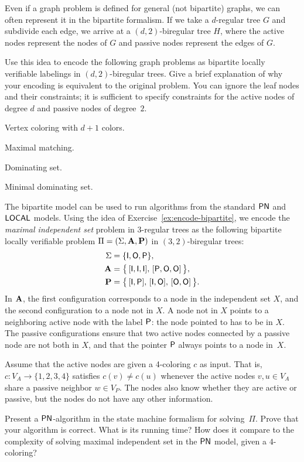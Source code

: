 \begin{ex}\label{ex:encode-bipartite}
Even if a graph problem is defined for general (not bipartite) graphs, we can often represent it in the bipartite formalism. If we take a $d$-regular tree $G$ and subdivide each edge, we arrive at a $(d,2)$-biregular tree $H$, where the active nodes represent the nodes of $G$ and passive nodes represent the edges of $G$.

Use this idea to encode the following graph problems as bipartite locally verifiable labelings in $(d,2)$-biregular trees. Give a brief explanation of why your encoding is equivalent to the original problem. You can ignore the leaf nodes and their constraints; it is sufficient to specify constraints for the active nodes of degree $d$ and passive nodes of degree~$2$.
\begin{subex}[noitemsep]
	\item Vertex coloring with $d+1$ colors.
	\item Maximal matching.
	\item Dominating set.
	\item Minimal dominating set.
\end{subex}
\end{ex}

\begin{ex}
	The bipartite model can be used to run algorithms from the standard $\textup{\sffamily PN}$ and $\textup{\sffamily LOCAL}$ models. Using the idea of Exercise~\ref{ex:encode-bipartite}, we encode the \emph{maximal independent set} problem in $3$-regular trees as the following bipartite locally verifiable problem $\Pi = (\Sigma, \mathbf{A}, \mathbf{P})$ in $(3,2)$-biregular trees:
	\begin{align*}
		\Sigma &= \{ \mathsf{I}, \mathsf{O}, \mathsf{P} \}, \\
		\mathbf{A} &= \bigl\{ \, [\mathsf{I}, \mathsf{I}, \mathsf{I}],\, [\mathsf{P}, \mathsf{O}, \mathsf{O}] \, \bigr\}, \\
		\mathbf{P} &= \bigl\{ \, [\mathsf{I}, \mathsf{P}],\, [\mathsf{I}, \mathsf{O}],\, [\mathsf{O}, \mathsf{O}] \, \bigr\}.
	\end{align*}
	In $\mathbf{A}$, the first configuration corresponds to a node in the independent set $X$, and the second configuration to a node not in $X$. A node not in $X$ points to a neighboring active node with the label $\mathsf{P}$: the node pointed to has to be in $X$. The passive configurations ensure that two active nodes connected by a passive node are not both in $X$, and that the pointer $\mathsf{P}$ always points to a node in~$X$.
	
	Assume that the active nodes are given a 4-coloring $c$ as input. That is, $c\colon V_A \to \{1,2,3,4\}$ satisfies $c(v) \ne c(u)$ whenever the active nodes $v,u \in V_A$ share a passive neighbor $w \in V_P$. The nodes also know whether they are active or passive, but the nodes do not have any other information.
	
	Present a $\textup{\sffamily PN}$-algorithm in the state machine formalism for solving~$\Pi$. Prove that your algorithm is correct. What is its running time? How does it compare to the complexity of solving maximal independent set in the $\textup{\sffamily PN}$ model, given a $4$-coloring? 
\end{ex}


